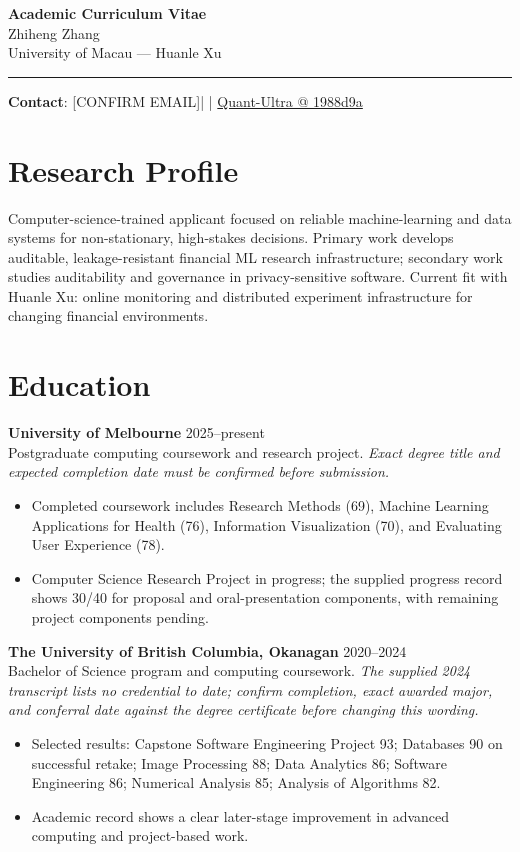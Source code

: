 \documentclass[11pt]{article}
\makeatletter
\newcommand{\ApplicantName}{Zhiheng Zhang}
\newcommand{\ApplicantEmail}{[CONFIRM EMAIL]}
\newcommand{\ApplicantPhone}{[CONFIRM PHONE]}
\newcommand{\ApplicantGitHub}{\href{https://github.com/zhiheng-zhang-Mera/Quant-Ultra/tree/1988d9a8530da91a8158de864d098ea869098923}{Quant-Ultra @ 1988d9a}}
\makeatother
\begin{document}
\begin{center}
{\LARGE\bfseries Academic Curriculum Vitae}\\[0.25em]
{\large \ApplicantName}\\
University of Macau --- Huanle Xu
\end{center}
\vspace{0.35em}\hrule\vspace{0.65em}

\textbf{Contact}: \ApplicantEmail\quad | \quad \ApplicantPhone\quad | \quad \ApplicantGitHub

\section*{Research Profile}
Computer-science-trained applicant focused on reliable machine-learning and data systems for non-stationary, high-stakes decisions. Primary work develops auditable, leakage-resistant financial ML research infrastructure; secondary work studies auditability and governance in privacy-sensitive software. Current fit with Huanle Xu: online monitoring and distributed experiment infrastructure for changing financial environments.

\section*{Education}
\textbf{University of Melbourne} \hfill 2025--present\\
Postgraduate computing coursework and research project. \textit{Exact degree title and expected completion date must be confirmed before submission.}
\begin{itemize}
\item Completed coursework includes Research Methods (69), Machine Learning Applications for Health (76), Information Visualization (70), and Evaluating User Experience (78).
\item Computer Science Research Project in progress; the supplied progress record shows 30/40 for proposal and oral-presentation components, with remaining project components pending.
\end{itemize}

\textbf{The University of British Columbia, Okanagan} \hfill 2020--2024\\
Bachelor of Science program and computing coursework. \textit{The supplied 2024 transcript lists no credential to date; confirm completion, exact awarded major, and conferral date against the degree certificate before changing this wording.}
\begin{itemize}
\item Selected results: Capstone Software Engineering Project 93; Databases 90 on successful retake; Image Processing 88; Data Analytics 86; Software Engineering 86; Numerical Analysis 85; Analysis of Algorithms 82.
\item Academic record shows a clear later-stage improvement in advanced computing and project-based work.
\end{itemize}
\end{document}
